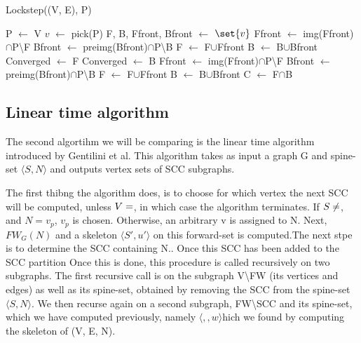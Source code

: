 \documentclass[../master.tex]{subfiles}
\newcommand{\FW}[2][G]{\ensuremath{FW_{#1}(#2)}}
\newcommand{\pair}[2]{\ensuremath{\langle #1, #2\rangle}}
\newcommand*\Let[2]{\State #1 $\gets$ #2}
\begin{document}
\begin{algorithm}
  \caption{Lockstep((V, E), P)}
  \begin{algorithmic}[1]
    \Let{P}{V}
    \Statex
    \State \Return
    \EndIf
    \Statex
      \Let{$v$}{pick(P)}
      \Let{F, B, Ffront, Bfront}{$\set{v}$}
      \Statex
      \Let{Ffront}{img(Ffront)$\cap$P\textbackslash F}
      \Let{Bfront}{preimg(Bfront)$\cap$P\textbackslash B}
      \Let{F}{F$\cup$Ffront}
       \Let{B}{B$\cup$Bfront}
       \EndWhile
       \Statex
        \Let{Converged}{F}
        \Else
        \Let{Converged}{B}
          \EndIf
      \Statex
       \Let{Ffront}{img(Ffront)$\cap$P\textbackslash F}
       \Let{Bfront}{preimg(Bfront)$\cap$P\textbackslash B}
       \Let{F}{F$\cup$Ffront}
       \Let{B}{B$\cup$Bfront}
       \EndWhile
       \Statex
       \Let{C}{F$\cap$B}
  \end{algorithmic}
\end{algorithm}
\subsection{Linear time algorithm}
The second algortihm we will be comparing is the linear time algorithm \cite{linear} introduced by Gentilini et al. This algorithm takes as input a graph G and spine-set $\langle S, N\rangle$ and outputs vertex sets of SCC subgraphs.

The first thibng the algorithm does, is to choose for which vertex the next SCC will be computed, unless $V=\empty$, in which case the algorithm terminates. If $S\neq\empty$, and $N={v_p}$, $v_p$ is chosen. Otherwise, an arbitrary v is assigned to N. Next, \FW{N} and a skeleton \pair{S'}{u'} on this forward-set is computed.The next stpe is to determine the SCC containing N.. Once this SCC has been added to the SCC partition 
Once this is done, this procedure is called recursively on two subgraphs. The first recursive call is on the subgraph V\textbackslash FW (its vertices and edges) as well as its spine-set, obtained by removing the SCC from the spine-set $\langle S, N\rangle$. We then recurse again on a second subgraph, FW\textbackslash SCC and its spine-set, which we have computed previously, namely \pair, which we found by computing the skeleton of (V, E, N).

\end{document}

